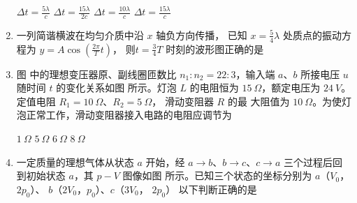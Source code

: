 \begin{enumerate}
\fourchoices
{$\Delta t=\frac{5 \lambda}{c}$}
{$ \Delta t=\frac{15 \lambda}{2 c}$}
{$ \Delta t=\frac{10 \lambda}{c}$}
{$ \Delta t=\frac{15 \lambda}{c}$}





\item
一列简谐横波在均匀介质中沿 $ x $ 轴负方向传播，
已知 $ x= \frac{ 5 }{ 4 } \lambda $ 处质点的振动方程为 $y=A \cos \left(\frac{2 \pi}{T} t\right)$，
则$ t= \frac{ 3 }{ 4 } T $
时刻的波形图正确的是  

\pfourchoices
{}
{}
{}
{}







\item
图  中的理想变压器原、副线圈匝数比 $ n_{1}:n_{2}=22:3 $，输入端 $ a $、$ b $ 所接电压 $ u $ 随时间 $ t $ 的变化关系如图  所示。灯泡 $ L $ 的电阻恒为 $ 15 \ \Omega $，额定电压为 $ 24 \ V $。定值电阻 $ R_{1} =10 \ \Omega $、$ R_{2} =5 \ \Omega $， 滑动变阻器 $ R $ 的最
大阻值为 $ 10 \ \Omega $。为使灯泡正常工作，滑动变阻器接入电路的电阻应调节为  

\begin{figure}[h!]
\centering
\begin{subfigure}{0.4\linewidth}
\centering
 
\caption{}\label{2020:山东:5a}
\end{subfigure}
\begin{subfigure}{0.4\linewidth}
\centering
 
\caption{}\label{2020:山东:5b}
\end{subfigure}	
\end{figure}


\fourchoices
{$ 1 \ \Omega $}
{$ 5 \ \Omega $}
{$ 6 \ \Omega $}
{$ 8 \ \Omega $}





\item
一定质量的理想气体从状态 $ a $ 开始，经 $ a \rightarrow b $、$ b \rightarrow c $、$ c \rightarrow a $ 三个过程后回到初始状态 $ a $，其 $ p-V $ 图像如图
所示。已知三个状态的坐标分别为 $ a $（$ V_{0} $， $ 2p_0 $）、 $ b $（$ 2V_0 $，$ p_{0} $）、$ c $（$ 3V_0 $， $ 2p_0 $） 以下判断正确的是  
\begin{figure}[h!]
\centering

\end{figure}



\end{enumerate}
